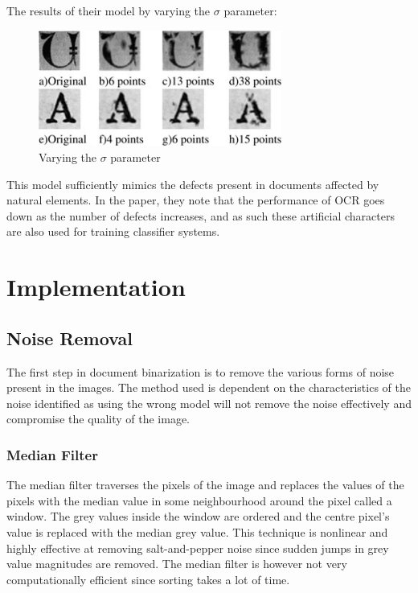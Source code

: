 \documentclass[a4paper, 12pt]{report}
\begin{document}
The results of their model by varying the \(\sigma\) parameter:

\begin{figure}[ht]
    \centering
    \includegraphics[width=8cm]{char_degradation.jpg}
    \caption{Varying the \(\sigma\) parameter~\cite{kieu2012character}}
    \label{fig:char_degradation}
\end{figure}

This model sufficiently mimics the defects present in documents affected by natural elements. In the paper, they note that the performance of OCR goes down as the number of defects increases, and as such these artificial characters are also used for training classifier systems.

\section{Implementation}

\subsection{Noise Removal}
The first step in document binarization is to remove the various forms of noise present in the images. The method used is dependent on the characteristics of the noise identified as using the wrong model will not remove the noise effectively and compromise the quality of the image.

\subsubsection{Median Filter}
The median filter traverses the pixels of the image and replaces the values of the pixels with the median value in some neighbourhood around the pixel called a window. The grey values inside the window are ordered and the centre pixel’s value is replaced with the median grey value. This technique is nonlinear and highly effective at removing salt-and-pepper noise since sudden jumps in grey value magnitudes are removed. The median filter is however not very computationally efficient since sorting takes a lot of time.
\end{document}
